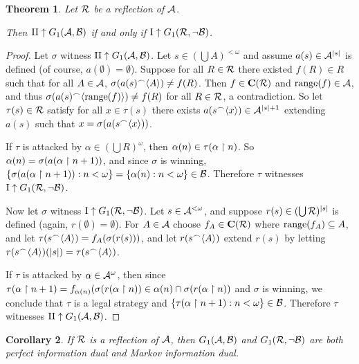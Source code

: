 \documentclass{amsart}
\theoremstyle{plain}
\newtheorem{theorem}{Theorem}
\newtheorem{corollary}[theorem]{Corollary}
\theoremstyle{definition}
\theoremstyle{remark}
\theoremstyle{plain}
\theoremstyle{definition}
\theoremstyle{remark}
\begin{document}
\begin{theorem}
  Let \(\mathcal{R}\) be a reflection of \(\mathcal{A}\). 

  Then
  \(\mathrm{II}\uparrow G_{1}(\mathcal{A},\mathcal{B})\) if and only if
  \(\mathrm{I}\uparrow G_{1}(\mathcal{R},\neg\mathcal{B})\).
\end{theorem}

\begin{proof}
  Let \(\sigma\) witness 
  \(\mathrm{II}\uparrow G_{1}(\mathcal{A},\mathcal{B})\).
  Let \(s\in(\bigcup A)^{<\omega}\) and assume \(a(s)\in\mathcal{A}^{|s|}\) is defined
  (of course, \(a(\emptyset)=\emptyset\)).
  Suppose for all \(R\in\mathcal{R}\) there existed \(f(R)\in R\) such that for all
  \(A\in\mathcal{A}\), \(\sigma(a(s){^\frown}\langle A\rangle)\not=f(R)\). Then
  \(f\in\mathbf C(\mathcal{R})\) and \(\text{range}(f)\in\mathcal{A}\), and thus 
  \(\sigma(a(s){^\frown}\langle\text{range}(f)\rangle)\not=f(R)\) for all \(R\in\mathcal{R}\), a contradiction.
  So let \(\tau(s)\in\mathcal{R}\) satisfy for all \(x\in\tau(s)\) there exists
  \(a(s{^\frown}\langle x\rangle)\in\mathcal{A}^{|s|+1}\) extending \(a(s)\) such that 
  \(x=\sigma(a(s{^\frown}\langle x\rangle))\).

  If \(\tau\) is attacked by \(\alpha\in(\bigcup R)^\omega\), then 
  \(\alpha(n)\in\tau(\alpha\restriction n)\). So \(\alpha(n)=\sigma(a(\alpha\restriction n+1))\),
  and since \(\sigma\) is winning, 
  \(\{\sigma(a(\alpha\restriction n+1)):n<\omega\}=\{\alpha(n):n<\omega\}\in\mathcal{B}\).
  Therefore \(\tau\) witnesses
  \(\mathrm{I}\uparrow G_{1}(\mathcal{R},\neg\mathcal{B})\).

  Now let \(\sigma\) witness
  \(\mathrm{I}\uparrow G_{1}(\mathcal{R},\neg\mathcal{B})\).
  Let \(s\in\mathcal{A}^{<\omega}\), and suppose \(r(s)\in(\bigcup \mathcal{R})^{|s|}\) is defined
  (again, \(r(\emptyset)=\emptyset\)). For \(A\in\mathcal{A}\) choose \(f_A\in\mathbf C(\mathcal{R})\)
  where \(\text{range}(f_A)\subseteq A\), and let \(\tau(s{^\frown}\langle A\rangle)=f_A(\sigma(r(s)))\),
  and let \(r(s{^\frown}\langle A\rangle)\) extend \(r(s)\) by letting
  \(r(s{^\frown}\langle A\rangle)(|s|)=\tau(s{^\frown}\langle A\rangle)\).

  If \(\tau\) is attacked by \(\alpha\in\mathcal{A}^\omega\), 
  then since \(\tau(\alpha\restriction n+1)=f_{\alpha(n)}(\sigma(r(\alpha\restriction n))\in\alpha(n)\cap\sigma(r(\alpha\restriction n))\)
  and \(\sigma\) is winning, we conclude that \(\tau\) is a legal strategy and
  \(\{\tau(\alpha\restriction n+1):n<\omega\}\in\mathcal{B}\).
  Therefore \(\tau\) witnesses
  \(\mathrm{II}\uparrow G_{1}(\mathcal{A},\mathcal{B})\).
\end{proof}

\begin{corollary}
  If \(\mathcal{R}\) is a reflection of \(\mathcal{A}\),
  then \(G_{1}(\mathcal{A},\mathcal{B})\) and \(G_{1}(\mathcal{R},\neg\mathcal{B})\)
  are both perfect information dual and Markov information dual.
\end{corollary}
\end{document}
